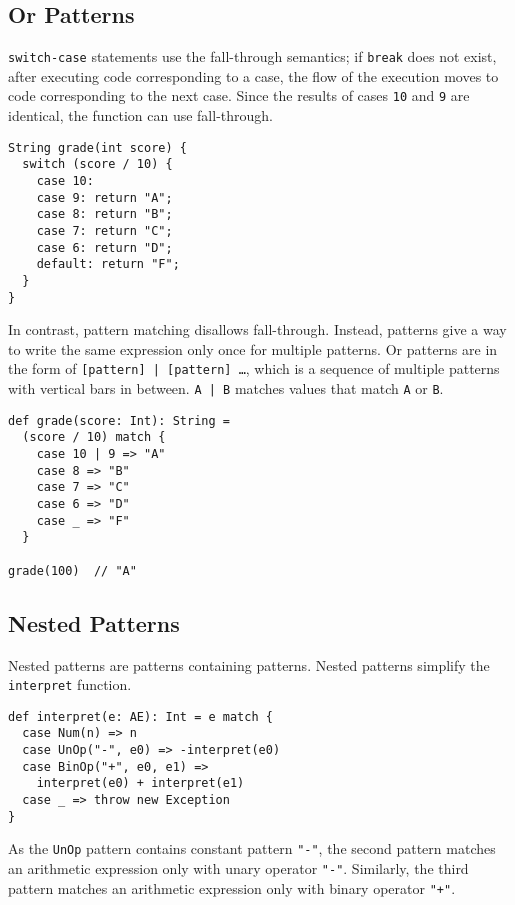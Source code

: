 \subsection{Or Patterns}

\verb!switch-case! statements use the fall-through semantics; if \verb!break!
does not exist, after executing code corresponding to a case, the flow of the
execution moves to code corresponding to the next case. Since the results of
cases \verb!10! and \verb!9! are identical, the function can use fall-through.

\begin{verbatim}
String grade(int score) {
  switch (score / 10) {
    case 10:
    case 9: return "A";
    case 8: return "B";
    case 7: return "C";
    case 6: return "D";
    default: return "F";
  }
}
\end{verbatim}

In contrast, pattern matching disallows fall-through. Instead,  patterns
give a way to write the same expression only once for multiple patterns. Or
patterns are in the form of \verb![pattern] | [pattern] …!, which is a sequence
of multiple patterns with vertical bars in between. \verb!A | B! matches values
that match \verb!A! or \verb!B!.

\begin{verbatim}
def grade(score: Int): String =
  (score / 10) match {
    case 10 | 9 => "A"
    case 8 => "B"
    case 7 => "C"
    case 6 => "D"
    case _ => "F"
  }

grade(100)  // "A"
\end{verbatim}

\subsection{Nested Patterns}

Nested patterns are patterns containing patterns. Nested patterns simplify the
\verb!interpret! function.

\begin{verbatim}
def interpret(e: AE): Int = e match {
  case Num(n) => n
  case UnOp("-", e0) => -interpret(e0)
  case BinOp("+", e0, e1) =>
    interpret(e0) + interpret(e1)
  case _ => throw new Exception
}
\end{verbatim}

As the \verb!UnOp! pattern contains constant pattern \verb!"-"!, the second
pattern matches an arithmetic expression only with unary operator \verb!"-"!.
Similarly, the third pattern matches an arithmetic expression only with binary
operator \verb!"+"!.


